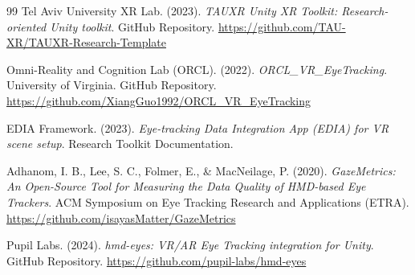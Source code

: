 \documentclass[12pt,a4paper]{article}
\begin{document}
\begin{thebibliography}{99}
    Tel Aviv University XR Lab. (2023).
    \textit{TAUXR Unity XR Toolkit: Research-oriented Unity toolkit}.
    GitHub Repository. \url{https://github.com/TAU-XR/TAUXR-Research-Template}

    Omni-Reality and Cognition Lab (ORCL). (2022).
    \textit{ORCL\_VR\_EyeTracking}.
    University of Virginia. GitHub Repository. \url{https://github.com/XiangGuo1992/ORCL_VR_EyeTracking}

    EDIA Framework. (2023).
    \textit{Eye-tracking Data Integration App (EDIA) for VR scene setup}.
    Research Toolkit Documentation.

    Adhanom, I. B., Lee, S. C., Folmer, E., \& MacNeilage, P. (2020).
    \textit{GazeMetrics: An Open-Source Tool for Measuring the Data Quality of HMD-based Eye Trackers}.
    ACM Symposium on Eye Tracking Research and Applications (ETRA). \url{https://github.com/isayasMatter/GazeMetrics}

    Pupil Labs. (2024).
    \textit{hmd-eyes: VR/AR Eye Tracking integration for Unity}.
    GitHub Repository. \url{https://github.com/pupil-labs/hmd-eyes}

\end{thebibliography}
\end{document}
